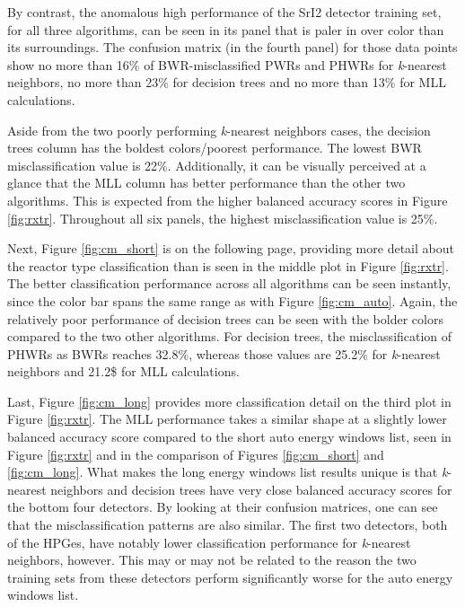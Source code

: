 By contrast, the anomalous high performance of the \gls{SrI2} detector training
set, for all three algorithms, can be seen in its panel that is paler in over
color than its surroundings.  The confusion matrix (in the fourth panel) for
those data points show no more than 16\% of \gls{BWR}-misclassified \gls{PWR}s
and \gls{PHWR}s for \textit{k}-nearest neighbors, no more than 23\% for
decision trees and no more than 13\% for \gls{MLL} calculations. 

Aside from the two poorly performing \textit{k}-nearest neighbors cases, the
decision trees column has the boldest colors/poorest performance.  The lowest
\gls{BWR} misclassification value is 22\%.  Additionally, it can be visually
perceived at a glance that the \gls{MLL} column has better performance than the
other two algorithms. This is expected from the higher balanced accuracy scores
in Figure \ref{fig:rxtr}.  Throughout all six panels, the highest
misclassification value is 25\%.

Next, Figure \ref{fig:cm_short} is on the following page, providing more detail
about the reactor type classification than is seen in the middle plot in Figure
\ref{fig:rxtr}.  The better classification performance across all algorithms
can be seen instantly, since the color bar spans the same range as with Figure
\ref{fig:cm_auto}. Again, the relatively poor performance of decision trees can
be seen with the bolder colors compared to the two other algorithms. For
decision trees, the misclassification of \gls{PHWR}s as \gls{BWR}s reaches
32.8\%, whereas those values are 25.2\% for \textit{k}-nearest neighbors and
21.2\$ for \gls{MLL} calculations.

Last, Figure \ref{fig:cm_long} provides more classification detail on the third
plot in Figure \ref{fig:rxtr}. The \gls{MLL} performance takes a similar shape
at a slightly lower balanced accuracy score compared to the short auto energy
windows list, seen in Figure \ref{fig:rxtr} and in the comparison of Figures
\ref{fig:cm_short} and \ref{fig:cm_long}. What makes the long energy windows
list results unique is that \textit{k}-nearest neighbors and decision trees
have very close balanced accuracy scores for the bottom four detectors. By
looking at their confusion matrices, one can see that the misclassification
patterns are also similar. The first two detectors, both of the \gls{HPGe}s,
have notably lower classification performance for \textit{k}-nearest neighbors,
however. This may or may not be related to the reason the two training sets
from these detectors perform significantly worse for the auto energy windows
list. 

